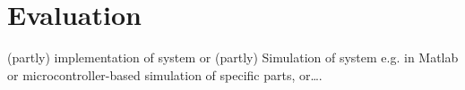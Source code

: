 \section{Evaluation}
(partly) implementation of system or (partly) Simulation of system e.g. in Matlab or microcontroller-based simulation of specific parts, or….
